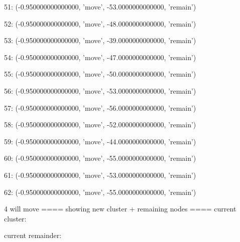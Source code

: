 51: (-0.950000000000000, 'move', -53.0000000000000, 'remain')


52: (-0.950000000000000, 'move', -48.0000000000000, 'remain')


53: (-0.950000000000000, 'move', -39.0000000000000, 'remain')


54: (-0.950000000000000, 'move', -47.0000000000000, 'remain')


55: (-0.950000000000000, 'move', -50.0000000000000, 'remain')


56: (-0.950000000000000, 'move', -53.0000000000000, 'remain')


57: (-0.950000000000000, 'move', -56.0000000000000, 'remain')


58: (-0.950000000000000, 'move', -52.0000000000000, 'remain')


59: (-0.950000000000000, 'move', -44.0000000000000, 'remain')


60: (-0.950000000000000, 'move', -55.0000000000000, 'remain')


61: (-0.950000000000000, 'move', -53.0000000000000, 'remain')


62: (-0.950000000000000, 'move', -55.0000000000000, 'remain')


4 will move
==== showing new cluster + remaining nodes ====
current cluster:


\begin{figure}[h!]
\end{figure}
current remainder:


